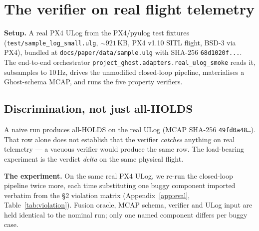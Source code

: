 \documentclass[11pt,a4paper]{article}
\begin{document}
\section{The verifier on real flight telemetry}
\label{sec:realflight}

\textbf{Setup.} A real PX4 ULog from the PX4/pyulog test fixtures
(\texttt{test/sample\_log\_small.ulg}, ${\sim}921$\,KB, PX4 v1.10
SITL flight, BSD-3 via PX4), bundled at
\texttt{docs/paper/data/sample.ulg} with SHA-256
\texttt{68d1020f...}. The end-to-end orchestrator
\texttt{project\_ghost.adapters.real\_ulog\_smoke}
reads it, subsamples to 10\,Hz, drives the unmodified closed-loop
pipeline, materialises a Ghost-schema MCAP, and runs the five
property verifiers.

\subsection{Discrimination, not just all-HOLDS}
\label{sec:realflight-discrim}

A naive run produces all-HOLDS on the real ULog (MCAP SHA-256
\texttt{49fd0a48\ldots}). That row alone does not establish that
the verifier \emph{catches} anything on real telemetry --- a
vacuous verifier would produce the same row. The load-bearing
experiment is the verdict \emph{delta} on the same physical
flight.

\textbf{The experiment.} On the same real PX4 ULog, we re-run the
closed-loop pipeline twice more, each time substituting one buggy
component imported verbatim from the \S2 violation matrix
(Appendix~\ref{app:eval}, Table~\ref{tab:violation}). Fusion
oracle, MCAP schema, verifier and ULog input are held identical to
the nominal run; only one named component differs per buggy case.
\end{document}
